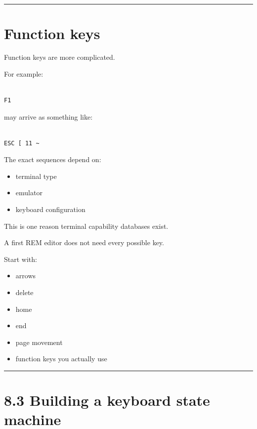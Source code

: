 \documentclass[
  oneside,
  openany]{book}
\providecommand{\tightlist}{%
  \setlength{\itemsep}{0pt}\setlength{\parskip}{0pt}}
\begin{document}
\begin{center}\rule{0.5\linewidth}{0.5pt}\end{center}

\hypertarget{function-keys}{%
\section{Function keys}\label{function-keys}}

Function keys are more complicated.

For example:

\begin{verbatim}

F1
\end{verbatim}

may arrive as something like:

\begin{verbatim}

ESC [ 11 ~
\end{verbatim}

The exact sequences depend on:

\begin{itemize}
\tightlist
\item
  terminal type
\item
  emulator
\item
  keyboard configuration
\end{itemize}

This is one reason terminal capability databases exist.

A first REM editor does not need every possible key.

Start with:

\begin{itemize}
\tightlist
\item
  arrows
\item
  delete
\item
  home
\item
  end
\item
  page movement
\item
  function keys you actually use
\end{itemize}

\begin{center}\rule{0.5\linewidth}{0.5pt}\end{center}

\hypertarget{building-a-keyboard-state-machine}{%
\section{8.3 Building a keyboard state
machine}\label{building-a-keyboard-state-machine}}
\end{document}
